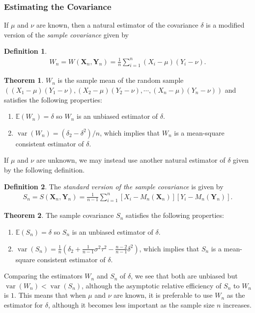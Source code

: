 \documentclass[a4paper,12pt]{article}
\theoremstyle{definition}
\newtheorem{theorem}{Theorem}[section]
\theoremstyle{definition}
\theoremstyle{definition}
\newtheorem{definition}{Definition}[section]
\newcommand{\bs}{\boldsymbol}
\newcommand{\var}{\operatorname{var}}
\begin{document}
    \subsubsection*{Estimating the Covariance}
    If $\mu$ and $\nu$ are known, then a natural estimator of the covariance $\delta$ is a modified version of the \textit{sample covariance} given by
    \begin{definition}
        \begin{align*}
            W_n = W(\bs{X}_n, \bs{Y}_n) = \frac{1}{n} \sum_{i = 1}^n (X_i - \mu)(Y_i - \nu).
        \end{align*}
    \end{definition}
    \begin{theorem}
        $W_n$ is the sample mean of the random sample $((X_1 - \mu)(Y_1 - \nu), (X_2 - \mu)(Y_2 - \nu), \cdots, (X_n - \mu)(Y_n - \nu))$ and satisfies the following properties:
        \begin{enumerate}[label=\alph*.]
            \item
                $\mathbb{E}(W_n) = \delta$ so $W_n$ is an unbiased estimator of $\delta$.
            \item
                $\var(W_n) = (\delta_2 - \delta^2) / n$, which implies that $W_n$ is a mean-square consistent estimator of $\delta$.
        \end{enumerate}
    \end{theorem}
    If $\mu$ and $\nu$ are unknown, we may instead use another natural estimator of $\delta$ given by the following definition.
    \begin{definition}
        The \textit{standard version of the sample covariance} is given by
        \begin{align*}
            S_n = S(\bs{X}_n, \bs{Y}_n) = \frac{1}{n - 1} \sum_{i = 1}^n [X_i - M_n(\bs{X}_n)][Y_i - M_n(\bs{Y}_n)].
        \end{align*}
    \end{definition}
    \begin{theorem}
        The sample covariance $S_n$ satisfies the following properties:
        \begin{enumerate}[label=\alph*.]
            \item
                $\mathbb{E}(S_n) = \delta$ so $S_n$ is an unbiased estimator of $\delta$.
            \item
                $\var(S_n) = \frac{1}{n} \left( \delta_2 + \frac{1}{n - 1} \sigma^2 \tau^2 - \frac{n - 2}{n - 1} \delta^2 \right)$, which implies that $S_n$ is a mean-square consistent estimator of $\delta$.
        \end{enumerate}
    \end{theorem}
    Comparing the estimators $W_n$ and $S_n$ of $\delta$, we see that both are unbiased but $\var(W_n) < \var(S_n)$, although the asymptotic relative efficiency of $S_n$ to $W_n$ is $1$. This means that when $\mu$ and $\nu$ are known, it is preferable to use $W_n$ as the estimator for $\delta$, although it becomes less important as the sample size $n$ increases. \par
\end{document}
